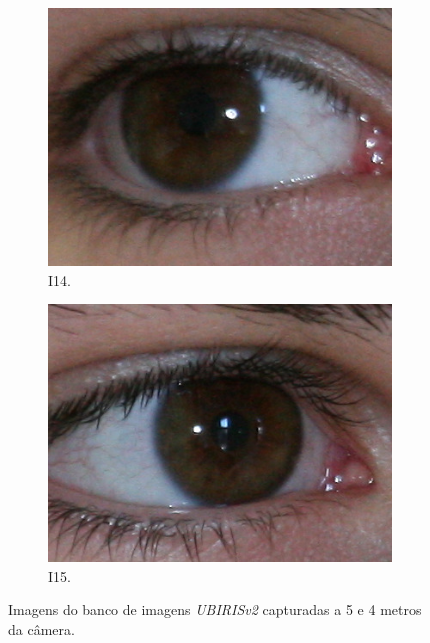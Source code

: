 \begin{figure}[htb]
\medskip
\begin{subfigure}{0.25\textwidth}
  \includegraphics[width=\linewidth]{img/Resultados/ubirisv2/C3_S1_I14.jpg}
  \caption{I14.}
\end{subfigure}\hfil %
\begin{subfigure}{0.25\textwidth}
  \includegraphics[width=\linewidth]{img/Resultados/ubirisv2/C3_S1_I15.jpg}
  \caption{I15.}
\end{subfigure}\hfil %
\caption{Imagens do banco de imagens \textit{UBIRISv2} capturadas a 5 e 4 metros da câmera.}
\label{fig:experimentos:ubirisv2}
\end{figure}

\FloatBarrier

